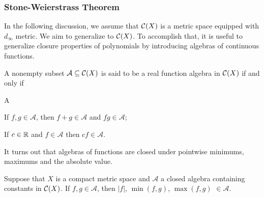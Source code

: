 \subsubsection{Stone-Weierstrass Theorem}
In the following discussion, we assume that $\C(X)$ is a metric space equipped with $d_\infty$ metric.
We aim to generalize  to $\C(X)$. To accomplish that, it is useful to generalize closure properties of polynomials by introducing algebras of continuous functions.
\begin{definition}[algebra on $\C(X)$]
\label{defn:top:algebra}
A nonempty subset $\mathcal{A} \subseteq {\mathcal C}(X)$ is said to be a real function algebra in $\C(X)$ if and only if
\begin{axioms}{A}
  \item \label{defn:anal:alg:2} If $f, g \in \mathcal{A}$, then $f + g \in \mathcal{A}$ and $fg \in \mathcal{A}$;
  \item \label{defn:anal:alg:3} If $c \in {\mathbb R}$ and $f \in \mathcal{A}$ then $cf \in \mathcal{A}$.
\end{axioms}
\end{definition}
It turns out that algebras of functions are closed under pointwise minimums, maximums and the absolute value.
\begin{lemma}
\label{lemma:top:closurelattice}
Suppose that $X$ is a compact metric space and $\mathcal{A}$ a closed algebra containing constants in $\C(X)$. If $f, g \in \mathcal{A}$, then $|f|$, $\min(f,g)$, $\max(f,g)$ $\in \mathcal{A}$.
\end{lemma}
